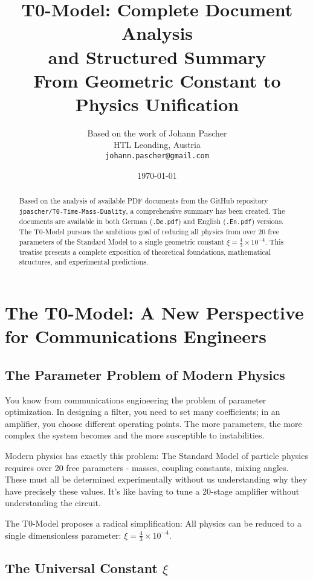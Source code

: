 \documentclass[12pt,a4paper]{article}
\title{{\Huge T0-Model: Complete Document Analysis}\\
	{\LARGE and Structured Summary}\\
	\vspace{1cm}
	{\Large From Geometric Constant to Physics Unification}}
\author{Based on the work of Johann Pascher\\
	HTL Leonding, Austria\\
	\texttt{johann.pascher@gmail.com}}
\date{\today}
\newcommand{\xipar}{\xi}
\begin{document}
	
	\maketitle
	
	\begin{abstract}
		Based on the analysis of available PDF documents from the GitHub repository \texttt{jpascher/T0-Time-Mass-Duality}, a comprehensive summary has been created. The documents are available in both German (\texttt{.De.pdf}) and English (\texttt{.En.pdf}) versions. The T0-Model pursues the ambitious goal of reducing all physics from over 20 free parameters of the Standard Model to a single geometric constant $\xipar = \frac{4}{3} \times 10^{-4}$. This treatise presents a complete exposition of theoretical foundations, mathematical structures, and experimental predictions.
	\end{abstract}
	
	\tableofcontents
	\newpage
\section{The T0-Model: A New Perspective for Communications Engineers}

\subsection{The Parameter Problem of Modern Physics}

You know from communications engineering the problem of parameter optimization. In designing a filter, you need to set many coefficients; in an amplifier, you choose different operating points. The more parameters, the more complex the system becomes and the more susceptible to instabilities.

Modern physics has exactly this problem: The Standard Model of particle physics requires over 20 free parameters - masses, coupling constants, mixing angles. These must all be determined experimentally without us understanding why they have precisely these values. It's like having to tune a 20-stage amplifier without understanding the circuit.

The T0-Model proposes a radical simplification: All physics can be reduced to a single dimensionless parameter: $\xi = \frac{4}{3} \times 10^{-4}$.

\subsection{The Universal Constant $\xi$}
\end{document}
